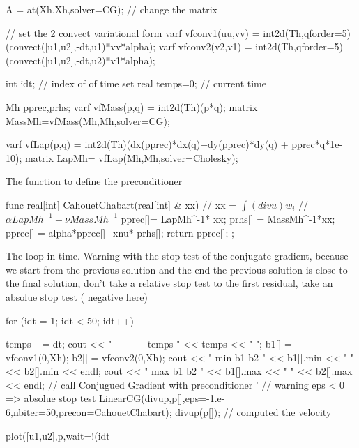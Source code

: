 \documentclass[twoside]{book}
\begin{document}
A = at(Xh,Xh,solver=CG);  //  change the matrix 

//  set the 2 convect variational form  
varf  vfconv1(uu,vv)  = int2d(Th,qforder=5) (convect([u1,u2],-dt,u1)*vv*alpha);
varf  vfconv2(v2,v1)  = int2d(Th,qforder=5) (convect([u1,u2],-dt,u2)*v1*alpha);

int idt;       // index of of time set
real temps=0;  // current time

Mh pprec,prhs;
varf vfMass(p,q) = int2d(Th)(p*q);
matrix MassMh=vfMass(Mh,Mh,solver=CG);

varf vfLap(p,q)  = int2d(Th)(dx(pprec)*dx(q)+dy(pprec)*dy(q) + pprec*q*1e-10);
matrix LapMh= vfLap(Mh,Mh,solver=Cholesky);
\eFF

 The function to define the preconditioner

\bFF

func real[int]  CahouetChabart(real[int] & xx)
{  //  xx = $ \int (div u) w_i$
   //   $ \alpha LapMh ^{-1}  + \nu MassMh^{-1} $ 
   pprec[]= LapMh^-1* xx; 
   prhs[] =  MassMh^-1*xx;
   pprec[] = alpha*pprec[]+xnu* prhs[];
   return pprec[];
};
\eFF

The loop in time.
Warning with the stop test of the conjugate gradient, because
we start from the previous solution and the end the previous solution
is close to the final solution, don't take a relative  stop test to
the first residual, take an absolue stop test ( negative here)
\bFF
 
for (idt = 1; idt < 50; idt++)
 {
   temps += dt;
   cout << " --------- temps " << temps << " \n ";
   b1[] =  vfconv1(0,Xh);
   b2[] =  vfconv2(0,Xh);
   cout << "  min b1 b2  " << b1[].min << " " << b2[].min << endl;
   cout << "  max b1 b2  " << b1[].max << " " << b2[].max << endl;
   // call Conjugued Gradient with preconditioner '
   //  warning eps < 0 => absolue stop test 
   LinearCG(divup,p[],eps=-1.e-6,nbiter=50,precon=CahouetChabart);
   divup(p[]);   //  computed the velocity

   plot([u1,u2],p,wait=!(idt%
 }
\eFF
\end{document}
